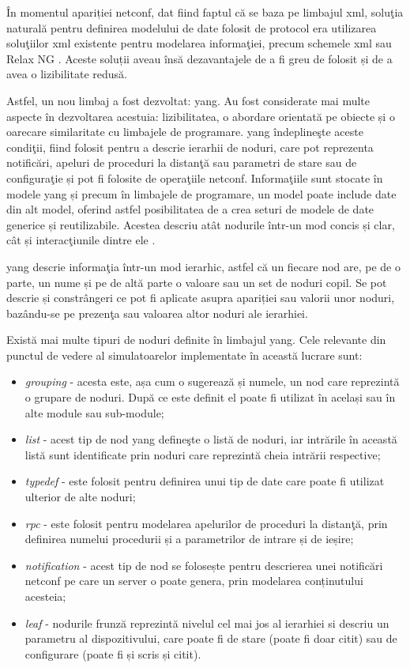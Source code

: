 În momentul apariției \gls{netconf}, dat fiind faptul că se baza pe limbajul \gls{xml}, soluţia naturală pentru definirea modelului de date folosit de protocol era utilizarea soluţiilor \gls{xml} existente pentru modelarea informaţiei, precum schemele \gls{xml} sau Relax NG \cite{ji2009challenges}. Aceste soluții aveau însă dezavantajele de a fi greu de folosit și de a avea o lizibilitate redusă.

Astfel, un nou limbaj a fost dezvoltat: \gls{yang}. Au fost considerate mai multe aspecte în dezvoltarea acestuia: lizibilitatea, o abordare orientată pe obiecte și o oarecare similaritate cu limbajele de programare. \gls{yang} îndeplineşte aceste condiţii, fiind folosit pentru a descrie ierarhii de noduri, care pot reprezenta notificări, apeluri de proceduri la distanţă sau parametri de stare sau de configuraţie și pot fi folosite de operaţiile \gls{netconf}. Informaţiile sunt stocate în modele \gls{yang} și precum în limbajele de programare, un model poate include date din alt model, oferind astfel posibilitatea de a crea seturi de modele de date generice și reutilizabile\cite{nataf2010end}. Acestea descriu atât nodurile într-un mod concis și clar, cât și interacţiunile dintre ele \cite{cui2009contrast}.

\gls{yang} descrie informaţia într-un mod ierarhic, astfel că un fiecare nod are, pe de o parte, un nume și pe de altă parte o valoare sau un set de noduri copil. Se pot descrie și constrângeri ce pot fi aplicate asupra apariției sau valorii unor noduri, bazându-se pe prezenţa sau valoarea altor noduri ale ierarhiei.

Există mai multe tipuri de noduri definite în limbajul \gls{yang}. Cele relevante din punctul de vedere al simulatoarelor implementate în această lucrare sunt:

\begin{itemize}
	\item \textit{grouping} - acesta este, așa cum o sugerează și numele, un nod care reprezintă o grupare de noduri. După ce este definit el poate fi utilizat în același sau în alte module sau sub-module;
	\item \textit{list} - acest tip de nod \gls{yang} defineşte o listă de noduri, iar intrările în această listă sunt identificate prin noduri care reprezintă cheia intrării respective;
	\item \textit{typedef} - este folosit pentru definirea unui tip de date care poate fi utilizat ulterior de alte noduri;
	\item \textit{rpc} - este folosit pentru modelarea apelurilor de proceduri la distanţă, prin definirea numelui procedurii și a parametrilor de intrare și de ieșire;
	\item \textit{notification} - acest tip de nod se folosește pentru descrierea unei notificări \gls{netconf} pe care un server o poate genera, prin modelarea conținutului acesteia;
	\item \textit{leaf} - nodurile frunză reprezintă nivelul cel mai jos al ierarhiei si descriu un parametru al dispozitivului, care poate fi de stare (poate fi doar citit) sau de configurare (poate fi și scris și citit).
\end{itemize}

